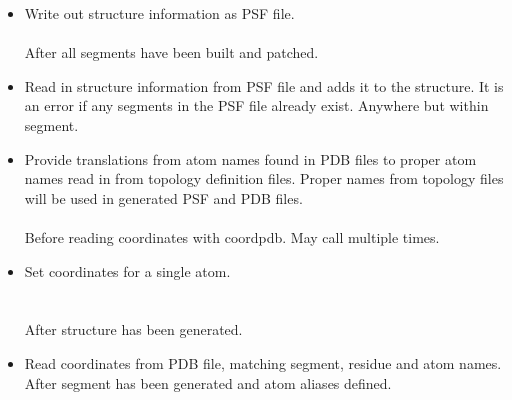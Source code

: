 \begin{itemize}
\item {}
{Write out structure information as PSF file.}
{ \\
\\
}
{After all segments have been built and patched.}

\item {}
{Read in structure information from PSF file and adds it to the structure.
It is an error if any segments in the PSF file already exist.}
{}
{Anywhere but within segment.}

\item {}
{Provide translations from atom names found in PDB files to proper
atom names read in from topology definition files.  Proper names
from topology files will be used in generated PSF and PDB files.}
{\\
\\
}
{Before reading coordinates with coordpdb.  May call multiple times.}

\item {}
{Set coordinates for a single atom.}
{\\
\\
\\
}
{After structure has been generated.}

\item {}
{Read coordinates from PDB file, matching segment, residue and atom names.}
{\\
}
{After segment has been generated and atom aliases defined.}


\end{itemize}
